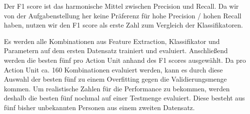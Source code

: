 Der F1 score ist das harmonische Mittel zwischen Precision und Recall. Da wir
von der Aufgabenstellung her keine Präferenz für hohe Precision / hohen Recall
haben, nutzen wir den F1 score als erste Zahl zum Vergleich der Klassifikatoren.

Es werden alle Kombinationen aus Feature Extraction, Klassifikator und Parametern
auf dem ersten Datensatz trainiert und evaluiert. Anschließend werden die besten
fünf pro Action Unit anhand des F1 scores ausgewählt. Da pro Action Unit ca. 160
Kombinationen evaluiert werden, kann es durch diese Auswahl der besten fünf zu
einem Overfitting gegen die Validierungsmenge kommen. Um realistische Zahlen für
die Performance zu bekommen, werden deshalb die besten fünf nochmal auf einer
Testmenge evaluiert. Diese besteht aus fünf bisher unbekannten Personen aus
einem zweiten Datensatz.


